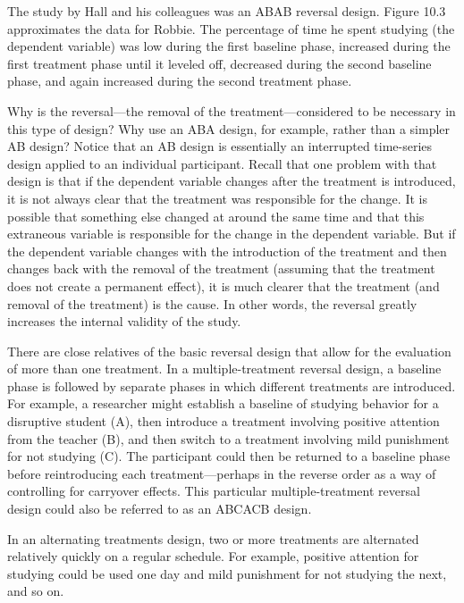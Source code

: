 The study by Hall and his colleagues was an ABAB reversal design. Figure 10.3 approximates the data for Robbie. The percentage of time he spent studying (the dependent variable) was low during the first baseline phase, increased during the first treatment phase until it leveled off, decreased during the second baseline phase, and again increased during the second treatment phase.

Why is the reversal---the removal of the treatment---considered to be necessary in this type of design? Why use an ABA design, for example, rather than a simpler AB design? Notice that an AB design is essentially an interrupted time-series design applied to an individual participant. Recall that one problem with that design is that if the dependent variable changes after the treatment is introduced, it is not always clear that the treatment was responsible for the change. It is possible that something else changed at around the same time and that this extraneous variable is responsible for the change in the dependent variable. But if the dependent variable changes with the introduction of the treatment and then changes back with the removal of the treatment (assuming that the treatment does not create a permanent effect), it is much clearer that the treatment (and removal of the treatment) is the cause. In other words, the reversal greatly increases the internal validity of the study.

There are close relatives of the basic reversal design that allow for the evaluation of more than one treatment. In a multiple-treatment reversal design, a baseline phase is followed by separate phases in which different treatments are introduced. For example, a researcher might establish a baseline of studying behavior for a disruptive student (A), then introduce a treatment involving positive attention from the teacher (B), and then switch to a treatment involving mild punishment for not studying (C). The participant could then be returned to a baseline phase before reintroducing each treatment---perhaps in the reverse order as a way of controlling for carryover effects. This particular multiple-treatment reversal design could also be referred to as an ABCACB design.

In an alternating treatments design, two or more treatments are alternated relatively quickly on a regular schedule. For example, positive attention for studying could be used one day and mild punishment for not studying
the next, and so on. 



